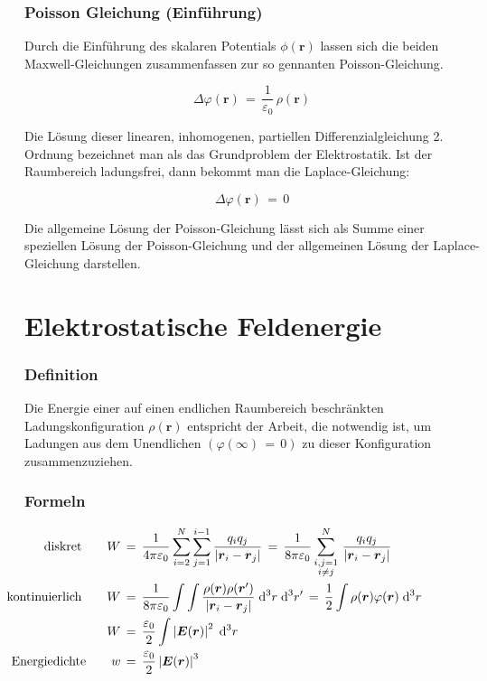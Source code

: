 \documentclass[titlepage,11pt,a4paper,ngerman]{report}
\renewcommand{\vec}[1]{\boldsymbol{#1}}
\renewcommand{\epsilon}{\varepsilon}
\renewcommand{\paragraph}[1]{\subsubsection{#1}}
\begin{document}
\paragraph{Poisson Gleichung (Einführung)}
Durch die Einführung  des skalaren Potentials $\phi(\vec{r})$ lassen sich die beiden Maxwell-Gleichungen zusammenfassen zur so gennanten Poisson-Gleichung.

\[\Delta\varphi(\vec{r})\,=\,\frac{1}{\epsilon_0}\,\rho(\vec{r})\]

Die Lösung dieser linearen, inhomogenen, partiellen Differenzialgleichung 2. Ordnung bezeichnet man als das Grundproblem der Elektrostatik. Ist der Raumbereich ladungsfrei, dann bekommt man die Laplace-Gleichung:

\[\Delta\varphi(\vec{r})\,=\,0\]

Die allgemeine Lösung der Poisson-Gleichung lässt sich als Summe einer speziellen Lösung der Poisson-Gleichung und der allgemeinen Lösung der Laplace-Gleichung darstellen.

\section{Elektrostatische Feldenergie}
\paragraph{Definition}
Die Energie einer auf einen endlichen Raumbereich beschränkten Ladungskonfiguration $\rho(\vec{r})$ entspricht der Arbeit, die notwendig ist, um Ladungen aus dem Unendlichen $(\varphi(\infty)\,=\,0)$ zu dieser Konfiguration zusammenzuziehen.

\paragraph{Formeln}
\begin{align*}
\llap{diskret}\qquad W\,&=\,\frac{1}{4\pi\epsilon_0}\sum_{i=2}^{N}\sum_{j=1}^{i-1}\frac{q_i q_j}{\left|\vec{r}_i - \vec{r}_j \right|}\,=\,\frac{1}{8\pi\epsilon_0}\sum_{\substack{i,j=1\\ i\neq j}}^{N}\,\frac{q_i q_j}{\left|\vec{r}_i - \vec{r}_j \right|}\\
\llap{kontinuierlich}\qquad W\,&=\,\frac{1}{8\pi\epsilon_0}\int\int\frac{\rho(\vec{r})\rho(\vec{r}')}{\left|\vec{r}_i - \vec{r}_j \right|}\;\mathrm{d}^3r\;\mathrm{d}^3r'\,=\,\frac{1}{2}\int\rho(\vec{r})\varphi(\vec{r})\;\mathrm{d}^3r\\
W\,&=\,\frac{\epsilon_0}{2}\int\left|\vec{E}(\vec{r})\right|^2\;\mathrm{d}^3r\\
\llap{Energiedichte}\qquad w\,&=\,\frac{\epsilon_0}{2}\left|\vec{E}(\vec{r})\right|^3
\end{align*}
\end{document}
